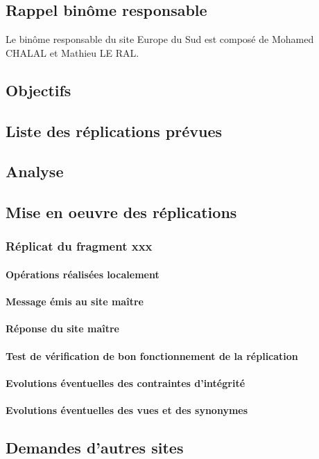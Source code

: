 \documentclass[10pt,a4paper,twoside]{article}
\begin{document}
\subsection{Rappel binôme responsable}
Le binôme responsable du site Europe du Sud est composé de Mohamed CHALAL et Mathieu LE RAL.
\subsection{Objectifs}
\subsection{Liste des réplications prévues}
\subsection{Analyse}
\subsection{Mise en oeuvre des réplications}
\subsubsection{Réplicat du fragment xxx}
\paragraph{Opérations réalisées localement}
\paragraph{Message émis au site maître}
\paragraph{Réponse du site maître}
\paragraph{Test de vérification de bon fonctionnement de la réplication}
\paragraph{Evolutions éventuelles des contraintes d'intégrité}
\paragraph{Evolutions éventuelles des vues et des synonymes}
\subsection{Demandes d'autres sites}
\end{document}
